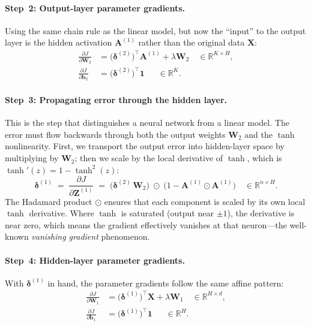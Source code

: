 \documentclass[11pt]{article}
\newcommand{\R}{\mathbb{R}}
\newcommand{\bX}{\mathbf{X}}
\newcommand{\bW}{\mathbf{W}}
\newcommand{\bb}{\mathbf{b}}
\newcommand{\bZ}{\mathbf{Z}}
\newcommand{\bA}{\mathbf{A}}
\newcommand{\bone}{\mathbf{1}}
\newcommand{\bdelta}{\boldsymbol{\delta}}
\begin{document}
\paragraph{Step~2: Output-layer parameter gradients.}
Using the same chain rule as the linear model, but now the ``input'' to the output layer is the hidden activation $\bA^{(1)}$ rather than the original data $\bX$:
\begin{align}
  \frac{\partial J}{\partial \bW_2} &= \bigl(\bdelta^{(2)}\bigr)^\top \bA^{(1)} + \lambda\bW_2 \quad \in \R^{K \times H}, \label{eq:nn_dW2}\\[4pt]
  \frac{\partial J}{\partial \bb_2} &= \bigl(\bdelta^{(2)}\bigr)^\top \bone \quad\;\;\in \R^{K}. \label{eq:nn_db2}
\end{align}

\paragraph{Step~3: Propagating error through the hidden layer.}
This is the step that distinguishes a neural network from a linear model. The error must flow backwards through both the output weights $\bW_2$ and the $\tanh$ nonlinearity. First, we transport the output error into hidden-layer space by multiplying by $\bW_2$; then we scale by the local derivative of $\tanh$, which is $\tanh'(z) = 1 - \tanh^2(z)$:
\begin{equation}\label{eq:nn_delta1}
  \bdelta^{(1)} \;=\; \frac{\partial J}{\partial \bZ^{(1)}}
  \;=\; \bigl(\bdelta^{(2)}\,\bW_2\bigr)
  \;\odot\;
  \bigl(1 - \bA^{(1)} \odot \bA^{(1)}\bigr)
  \quad \in \R^{n \times H}.
\end{equation}
The Hadamard product $\odot$ ensures that each component is scaled by its own local $\tanh$ derivative. Where $\tanh$ is saturated (output near $\pm 1$), the derivative is near zero, which means the gradient effectively vanishes at that neuron---the well-known \emph{vanishing gradient} phenomenon.

\paragraph{Step~4: Hidden-layer parameter gradients.}
With $\bdelta^{(1)}$ in hand, the parameter gradients follow the same affine pattern:
\begin{align}
  \frac{\partial J}{\partial \bW_1} &= \bigl(\bdelta^{(1)}\bigr)^\top \bX + \lambda\bW_1 \quad \in \R^{H \times d}, \label{eq:nn_dW1}\\[4pt]
  \frac{\partial J}{\partial \bb_1} &= \bigl(\bdelta^{(1)}\bigr)^\top \bone \quad\;\;\in \R^{H}. \label{eq:nn_db1}
\end{align}
\end{document}
